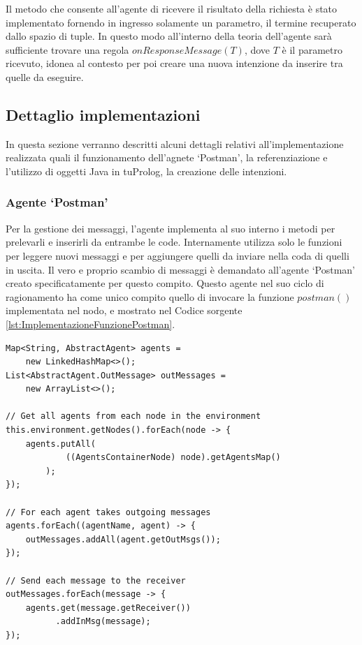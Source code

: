 Il metodo che consente all'agente di ricevere il risultato della richiesta è stato implementato fornendo in ingresso solamente un parametro, il termine recuperato dallo spazio di tuple. In questo modo all'interno della teoria dell'agente sarà sufficiente trovare una regola $onResponseMessage(T)$, dove $T$ è il parametro ricevuto, idonea al contesto per poi creare una nuova intenzione da inserire tra quelle da eseguire.

\subsection{Dettaglio implementazioni}\label{sctn:DettaglioImplementazioni}
In questa sezione verranno descritti alcuni dettagli relativi all'implementazione realizzata quali il funzionamento dell'agnete `Postman', la referenziazione e l'utilizzo di oggetti Java in tuProlog, la creazione delle intenzioni.

\subsubsection{Agente `Postman'}
Per la gestione dei messaggi, l'agente implementa al suo interno i metodi per prelevarli e inserirli da entrambe le code. Internamente utilizza solo le funzioni per leggere nuovi messaggi e per aggiungere quelli da inviare nella coda di quelli in uscita.
Il vero e proprio scambio di messaggi è demandato all'agente `Postman' creato specificatamente per questo compito. Questo agente nel suo ciclo di ragionamento ha come unico compito quello di invocare la funzione $postman()$ implementata nel nodo, e mostrato nel Codice sorgente \ref{lst:ImplementazioneFunzionePostman}.

\switchToJava{}{\small}
\begin{lstlisting}[float,firstnumber=1,label={lst:ImplementazioneFunzionePostman},caption={Implementazione funzione Postman}]
Map<String, AbstractAgent> agents =
	new LinkedHashMap<>();
List<AbstractAgent.OutMessage> outMessages =
	new ArrayList<>();

// Get all agents from each node in the environment
this.environment.getNodes().forEach(node -> {
    agents.putAll(
    		((AgentsContainerNode) node).getAgentsMap()
    	);
});

// For each agent takes outgoing messages
agents.forEach((agentName, agent) -> {
    outMessages.addAll(agent.getOutMsgs());
});

// Send each message to the receiver
outMessages.forEach(message -> {
    agents.get(message.getReceiver())
          .addInMsg(message);
});
\end{lstlisting}

